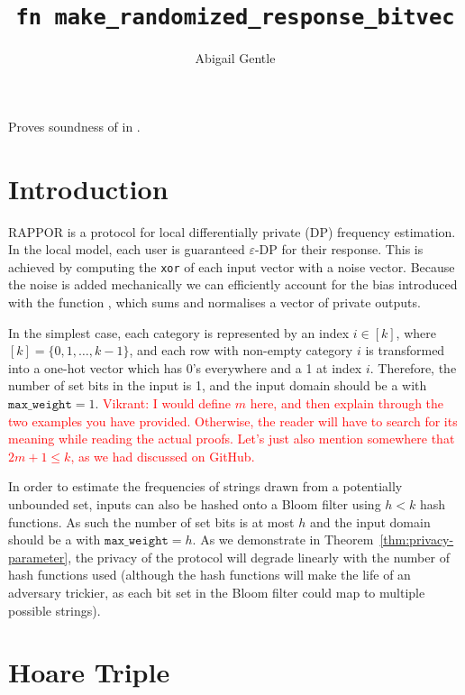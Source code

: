 \documentclass{article}
\title{\texttt{fn make\_randomized\_response\_bitvec}}
\author{Abigail Gentle}
\begin{document}
\maketitle



\contrib

Proves soundness of  in .

\section{Introduction}
RAPPOR is a protocol for local differentially private (DP) frequency estimation. In the local model, each user is guaranteed $\varepsilon$-DP for their response. This is achieved by computing the \texttt{xor} of each input vector with a noise vector. Because the noise is added mechanically we can efficiently account for the bias introduced with the function , which sums and normalises a vector of private outputs.

In the simplest case, each category is represented by an index $i\in[k]$, where $[k]=\{0,1,\ldots,k-1\}$, and each row with non-empty category $i$ is transformed into a one-hot vector which has 0's everywhere and a 1 at index $i$. Therefore, the number of set bits in the input is 1, and the input domain should be a  with $\texttt{max\_weight}=1$. \textcolor{red}{Vikrant: I would define $m$ here, and then explain through the two examples you have provided. Otherwise, the reader will have to search for its meaning while reading the actual proofs. Let's just also mention somewhere that $2m+1 \leq k$, as we had discussed on GitHub.}

In order to estimate the frequencies of strings drawn from a potentially unbounded set, inputs can also be hashed onto a Bloom filter using $h<k$ hash functions. As such the number of set bits is at most $h$ and the input domain should be a  with $\texttt{max\_weight}=h$. As we demonstrate in Theorem~\ref{thm:privacy-parameter}, the privacy of the protocol will degrade linearly with the number of hash functions used (although the hash functions will make the life of an adversary trickier, as each bit set in the Bloom filter could map to multiple possible strings).



\section{Hoare Triple}
\end{document}
